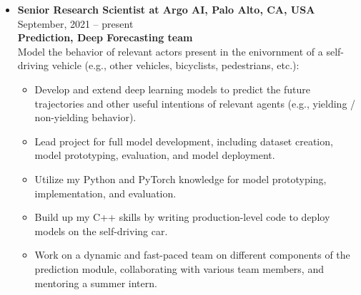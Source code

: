 \documentclass[10pt,letterpaper]{article}
\newcommand{\thing}[2]{{#1} \hfill {#2}}
\begin{document}
%	
%

\begin{itemize}%

\item \thing{\bf Senior Research Scientist at Argo AI, Palo Alto, CA, USA}{September, 2021 -- present}\\
	{\bf Prediction, Deep Forecasting team}\vspace{0.5em}\\
      	Model the behavior of relevant actors present in the enivornment of a self-driving vehicle (e.g., other vehicles, bicyclists, pedestrians, etc.):
      	\begin{itemize} \itemsep0em 
      	\vspace{-0.5em}
      		\item Develop and extend deep learning models to predict the future trajectories and other useful intentions of relevant agents (e.g., yielding / non-yielding behavior).
      		\item Lead project for full model development, including dataset creation, model prototyping, evaluation, and model deployment.
      		\item Utilize my Python and PyTorch knowledge for model prototyping, implementation, and evaluation.
      		\item Build up my C++ skills by writing production-level code to deploy models on the self-driving car.
      		\item Work on a dynamic and fast-paced team on different components of the prediction module, collaborating with various team members, and mentoring a summer intern.
	\end{itemize}
	

\end{itemize}
\end{document}
